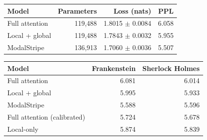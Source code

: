 \documentclass[11pt,letterpaper]{article}
\begin{document}
\begin{center}\begin{minipage}{\textwidth}\centering\small
{}

\begin{tabular}{lrrr}\toprule
Model & Parameters & Loss (nats) & PPL\\\midrule
Full attention & 119,488 & 1.8015 $\pm$ 0.0084 & 6.058 \\
Local + global & 119,488 & 1.7843 $\pm$ 0.0032 & 5.955 \\
ModalStripe & 136,913 & 1.7060 $\pm$ 0.0036 & 5.507 \\
\bottomrule\end{tabular}


\end{minipage}\end{center}

\begin{center}\begin{minipage}{\textwidth}\centering\small
{}

\begin{tabular}{lrr}\toprule
Model & Frankenstein & Sherlock Holmes\\\midrule
Full attention & 6.081 & 6.014 \\
Local + global & 5.995 & 5.933 \\
ModalStripe & 5.588 & 5.596 \\
Full attention (calibrated) & 5.724 & 5.678 \\
Local-only & 5.874 & 5.839 \\
\bottomrule\end{tabular}


\end{minipage}\end{center}
\end{document}
